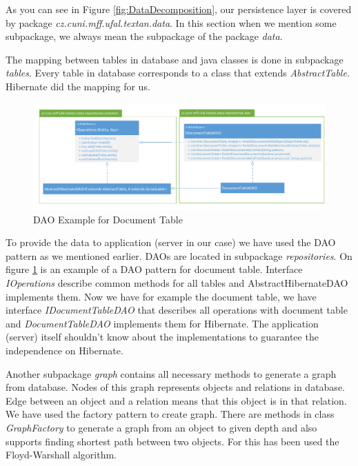 As you can see in Figure \ref{fig:DataDecomposition}, our persistence layer is
covered by package \emph{cz.cuni.mff.ufal.textan.data}. In this section when we
mention some subpackage, we always mean the subpackage of the package \emph{data}.

The mapping between tables in database and java classes is done in subpackage
\emph{tables}. Every table in database corresponds to a class that extends
\emph{AbstractTable}. Hibernate did the mapping for us. 

\begin{figure}[!htb]
        \centering
        \includegraphics[width=\textwidth]{Images/DatabaseDAO}
        \caption{DAO Example for Document Table}
        \label{fig:DatabaseDAO}
\end{figure}

To provide the data to application (server in our case) we have used the DAO pattern
as we mentioned earlier. DAOs are located in subpackage \emph{repositories}. On figure
\ref{fig:DatabaseDAO} is an example of a DAO pattern for document table. Interface
\emph{IOperations} describe common methods for all tables and AbstractHibernateDAO
implements them. Now we have for example the document table, we have interface
\emph{IDocumentTableDAO} that describes all operations with document table and
\emph{DocumentTableDAO} implements them for Hibernate. The application (server)
itself shouldn't know about the implementations to guarantee the independence
on Hibernate.

Another subpackage \emph{graph} contains all necessary methods to generate a graph
from database. Nodes of this graph represents objects and relations in database.
Edge between an object and a relation means that this object is in that relation.
We have used the factory pattern to create graph. There are methods in class
\emph{GraphFactory} to generate a graph from an object to given depth and also
supports finding shortest path between two objects. For this has been used the Floyd-Warshall
algorithm.

